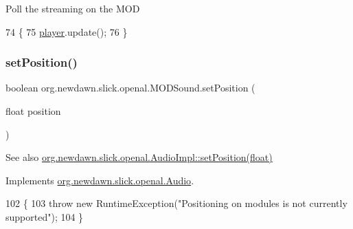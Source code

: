 Poll the streaming on the M\+OD 
\begin{DoxyCode}
74                        \{
75         \mbox{\hyperlink{classorg_1_1newdawn_1_1slick_1_1openal_1_1_m_o_d_sound_a84e16ce359baa328eeda4127a337f692}{player}}.update();
76     \}
\end{DoxyCode}
\mbox{\label{classorg_1_1newdawn_1_1slick_1_1openal_1_1_m_o_d_sound_a28988cbdc108aa8daab78bbad8750f97}} 
\subsubsection{\texorpdfstring{set\+Position()}{setPosition()}}
{\footnotesize\ttfamily boolean org.\+newdawn.\+slick.\+openal.\+M\+O\+D\+Sound.\+set\+Position (\begin{DoxyParamCaption}\item[{float}]{position }\end{DoxyParamCaption})\hspace{0.3cm}{\ttfamily [inline]}}

\begin{DoxySeeAlso}{See also}
\mbox{\hyperlink{classorg_1_1newdawn_1_1slick_1_1openal_1_1_audio_impl_a9291d2e2d534fdfbd6a50e4948de954f}{org.\+newdawn.\+slick.\+openal.\+Audio\+Impl\+::set\+Position(float)}} 
\end{DoxySeeAlso}


Implements \mbox{\hyperlink{interfaceorg_1_1newdawn_1_1slick_1_1openal_1_1_audio_ace6e2e6fd29f40a8fe5daf8b28bc75e7}{org.\+newdawn.\+slick.\+openal.\+Audio}}.


\begin{DoxyCode}
102                                                \{
103         \textcolor{keywordflow}{throw} \textcolor{keyword}{new} RuntimeException(\textcolor{stringliteral}{"Positioning on modules is not currently supported"});
104     \}
\end{DoxyCode}
\mbox{\label{classorg_1_1newdawn_1_1slick_1_1openal_1_1_m_o_d_sound_ab8d293141044f71f49e65e730b215be7}} 
